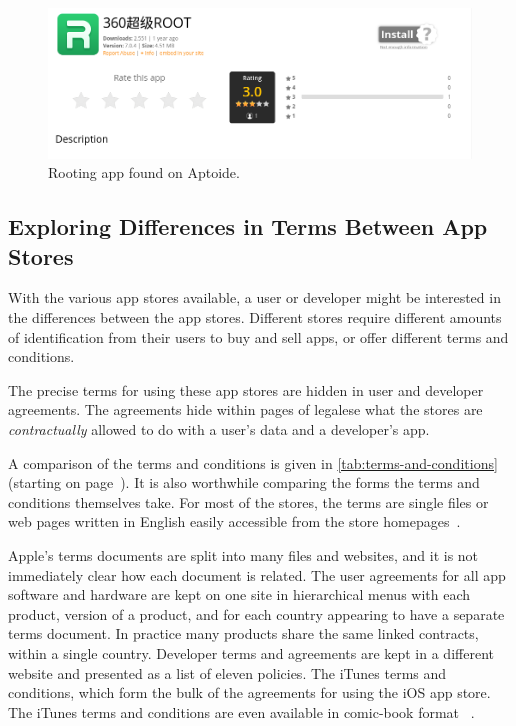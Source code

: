 \documentclass[thesis.tex]{subfiles}
\begin{document}
\begin{figure}
  \centering
  \includegraphics[width=0.8\linewidth]{figures/aptoide-root.png}
  \caption{Rooting app found on Aptoide.}
  \label{fig:aptoide-root}
\end{figure}


\subsection{Exploring Differences in Terms Between App Stores}

With the various app stores available, a user or developer might be
interested in the differences between the app stores.  Different stores require
different amounts of identification from their users to buy and sell
apps, or offer different terms and conditions.

The precise terms for using these app stores are hidden in user and
developer agreements.  The agreements hide within pages of legalese what the
stores are \emph{contractually} allowed to do with a user's data and a
developer's app.

A comparison of the terms and conditions is given in
\autoref{tab:terms-and-conditions} (starting on page~\pageref{tab:top-of-byod}). It is also worthwhile comparing the forms
the terms and conditions themselves take. For most of the stores, the terms are
single files or web pages written in English easily accessible from the store
homepages~\cite{yandex_yandex.store_nodate,aptoide_aptoide_nodate,google_google_nodate,amazon_amazon.co.uk_nodate}.

Apple's terms documents are split into many files and websites, and it is not
immediately clear how each document is related. The user agreements for all app
software and hardware are kept on one site in hierarchical menus with each
product, version of a product, and for each country appearing to have a separate
terms document. In practice many products share the same linked contracts,
within a single country. Developer terms and agreements are kept in a different
website and presented as a list of eleven policies. The iTunes terms and
conditions, which form the bulk of the agreements for using the iOS app store.
The iTunes terms and conditions are even available in comic-book format ~\cite{r._sikoryak_terms_2017}.
\end{document}
